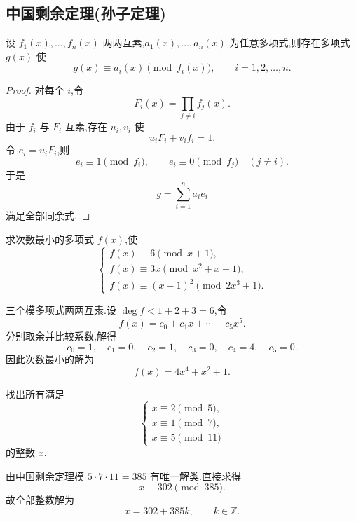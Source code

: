 \subsection{中国剩余定理(孙子定理)}

\begin{theorem}
设 $f_1(x),\ldots,f_n(x)$ 两两互素,$a_1(x),\ldots,a_n(x)$ 为任意多项式,则存在多项式 $g(x)$ 使
\[
  g(x)\equiv a_i(x)\pmod{f_i(x)},
  \qquad i=1,2,\ldots,n.
\]
\end{theorem}

\begin{proof}
对每个 $i$,令
\[
  F_i(x)=\prod_{j\ne i}f_j(x).
\]
由于 $f_i$ 与 $F_i$ 互素,存在 $u_i,v_i$ 使
\[
  u_iF_i+v_if_i=1.
\]
令 $e_i=u_iF_i$,则
\[
  e_i\equiv1\pmod{f_i},
  \qquad
  e_i\equiv0\pmod{f_j}\quad(j\ne i).
\]
于是
\[
  g=\sum\limits_{i=1}^n a_ie_i
\]
满足全部同余式.
\end{proof}

\begin{example}
求次数最小的多项式 $f(x)$,使
\[
\begin{cases}
  f(x)\equiv6\pmod{x+1},\\
  f(x)\equiv3x\pmod{x^2+x+1},\\
  f(x)\equiv(x-1)^2\pmod{2x^3+1}.
\end{cases}
\]
\end{example}
\exampleblank

\begin{solution}
三个模多项式两两互素.设 $\deg f<1+2+3=6$,令
\[
  f(x)=c_0+c_1x+\cdots+c_5x^5.
\]
分别取余并比较系数,解得
\[
  c_0=1,\quad c_1=0,\quad c_2=1,\quad c_3=0,\quad c_4=4,\quad c_5=0.
\]
因此次数最小的解为
\[
  \boxed{f(x)=4x^4+x^2+1}.
\]
\end{solution}

\begin{example}
找出所有满足
\[
\begin{cases}
  x\equiv2\pmod5,\\
  x\equiv1\pmod7,\\
  x\equiv5\pmod{11}
\end{cases}
\]
的整数 $x$.
\end{example}
\exampleblank

\begin{solution}
由中国剩余定理模 $5\cdot7\cdot11=385$ 有唯一解类.直接求得
\[
  x\equiv302\pmod{385}.
\]
故全部整数解为
\[
  \boxed{x=302+385k,\qquad k\in\mathbb{Z}}.
\]
\end{solution}

